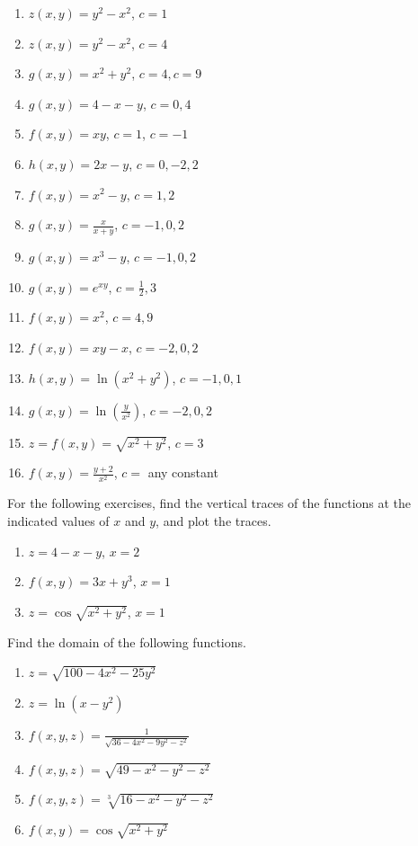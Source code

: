 \documentclass{exercises}
\begin{document}
\begin{enumerate}[resume]
\item $z(x,y)=y^{2}-x^{2}$, $c=1$
\item $z(x,y)=y^{2}-x^{2}$, $c=4$
\item $g(x,y)=x^{2}+y^{2}$, $c=4,c=9$
\item $g(x,y)=4-x-y$, $c=0,4$
\item $f(x,y)=xy$, $c=1$, $c=-1$
\item $h(x,y)=2x-y$, $c=0,-2,2$
\item $f(x,y)=x^{2}-y$, $c=1,2$
\item $g(x,y)=\frac{x}{x+y}$, $c=-1,0,2$
\item $g(x,y)=x^{3}-y$, $c=-1,0,2$
\item $g(x,y)=e^{xy}$, $c=\frac{1}{2},3$
\item $f(x,y)=x^{2}$, $c=4,9$
\item $f(x,y)=xy-x$, $c=-2,0,2$
\item $h(x,y)=\ln(x^{2}+y^{2})$, $c=-1,0,1$
\item $g(x,y)=\ln(\frac{y}{x^{2}})$, $c=-2,0,2$
\item $z=f(x,y)=\sqrt{x^{2}+y^{2}}$, $c=3$
\item $f(x,y)=\frac{y+2}{x^{2}}$, $c=$ any constant
\end{enumerate}

For the following exercises, find the vertical traces of the functions at the indicated values of $x$ and $y$, and plot the traces.

\begin{enumerate}[resume]
\item $z=4-x-y$, $x=2$
\item $f(x,y)=3x+y^{3}$, $x=1$
\item $z=\cos \sqrt{x^{2}+y^{2}}$, $x=1$
\end{enumerate}

Find the domain of the following functions.

\begin{enumerate}[resume]
\item $z=\sqrt{100-4x^{2}-25y^{2}}$
\item $z=\ln(x-y^{2})$
\item $f(x,y,z)=\frac{1}{\sqrt{36-4x^{2}-9y^{2}-z^{2}}}$
\item $f(x,y,z)=\sqrt{49-x^{2}-y^{2}-z^{2}}$
\item $f(x,y,z)=\sqrt[3]{16-x^{2}-y^{2}-z^{2}}$
\item $f(x,y)=\cos \sqrt{x^{2}+y^{2}}$
\end{enumerate}
\end{document}
